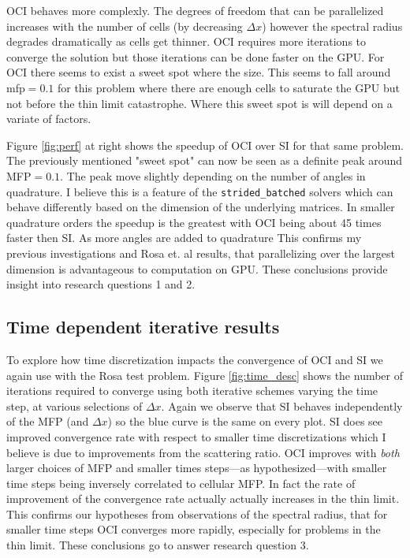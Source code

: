 OCI behaves more complexly.
The degrees of freedom that can be parallelized increases with the number of cells (by decreasing $\Delta x$) however the spectral radius degrades dramatically as cells get thinner.
OCI requires more iterations to converge the solution but those iterations can be done faster on the GPU.
For OCI there seems to exist a sweet spot where the size.
This seems to fall around mfp$=0.1$ for this problem where there are enough cells to saturate the GPU but not before the thin limit catastrophe.
Where this sweet spot is will depend on a variate of factors.

Figure \ref{fig:perf} at right shows the speedup of OCI over SI for that same problem. 
The previously mentioned "sweet spot" can now be seen as a definite peak around MFP$=0.1$.
The peak move slightly depending on the number of angles in quadrature.
I believe this is a feature of the \texttt{strided\_batched} solvers which can behave differently based on the dimension of the underlying matrices\cite{rocsolver}.
In smaller quadrature orders the speedup is the greatest with OCI being about 45 times faster then SI.
As more angles are added to quadrature
This confirms my previous investigations \cite{morgan2023oci} and Rosa et. al \cite{rosa_cellwise_2013} results, that parallelizing over the largest dimension is advantageous to computation on GPU.
These conclusions provide insight into research questions 1 and 2.

\subsection{Time dependent iterative results}

To explore how time discretization impacts the convergence of OCI and SI we again use with the Rosa test problem.
Figure \ref{fig:time_desc} shows the number of iterations required to converge using both iterative schemes varying the time step, at various selections of $\Delta x$.
Again we observe that SI behaves independently of the MFP (and $\Delta x$) so the blue curve is the same on every plot.
SI does see improved convergence rate with respect to smaller time discretizations which I believe is due to improvements from the scattering ratio.
OCI improves with \textit{both} larger choices of MFP and smaller times steps---as hypothesized---with smaller time steps being inversely correlated to cellular MFP.
In fact the rate of improvement of the convergence rate actually actually increases in the thin limit.
This confirms our hypotheses from observations of the spectral radius, that for smaller time steps OCI converges more rapidly, especially for problems in the thin limit.
These conclusions go to answer research question 3.

